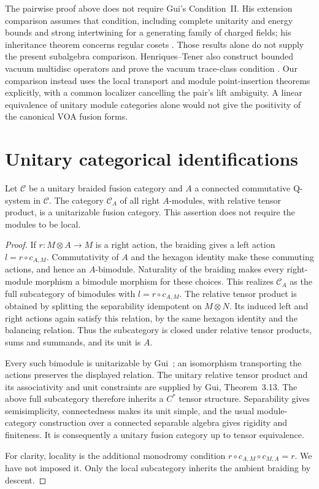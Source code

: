 The pairwise proof above does not require Gui's Condition~II.  His
extension comparison assumes that condition, including complete
unitarity and energy bounds and strong intertwining for a generating
family of charged fields; his inheritance theorem concerns regular
cosets \cite[Definition~4.15 and Theorems~4.20,~6.11]{GuiCompare}.
Those results alone do not supply the present subalgebra comparison.
Henriques--Tener also construct bounded vacuum
multidisc operators and prove the vacuum trace-class condition
\cite[Theorems~3.6 and~4.1]{HTGenusZero}.  Our comparison instead uses
the local transport and module point-insertion theorems explicitly,
with a common localizer cancelling the pair's lift ambiguity.  A linear
equivalence of unitary module categories alone would not give the
positivity of the canonical VOA fusion forms.

\section{Unitary categorical identifications}
\label{sec:analytic-category}

\begin{lemma}
\label{lem:analytic-unitary-all-modules}
Let $\mathcal C$ be a unitary braided fusion category and $A$ a
connected commutative Q-system in $\mathcal C$.  The category
$\mathcal C_A$ of all right $A$-modules, with relative tensor product,
is a unitarizable fusion category.  This assertion does not require
the modules to be local.
\end{lemma}
\begin{proof}
If $r:M\otimes A\to M$ is a right action, the braiding gives a left
action $l=r\circ c_{A,M}$.  Commutativity of $A$ and the hexagon
identity make these commuting actions, and hence an $A$-bimodule.
Naturality of the braiding makes every right-module morphism a
bimodule morphism for these choices.  This realizes $\mathcal C_A$
as the full subcategory of bimodules with $l=r\circ c_{A,M}$.
The relative tensor product is obtained by splitting the separability
idempotent on $M\otimes N$.  Its induced left and right actions again
satisfy this relation, by the same hexagon identity and the balancing
relation.  Thus the subcategory is closed under relative tensor
products, sums and summands, and its unit is $A$.

Every such bimodule is unitarizable by
Gui~\cite[Theorem~2.28]{Gui}; an isomorphism transporting the actions preserves
the displayed relation.  The unitary relative tensor product and its
associativity and unit constraints are supplied by Gui, Theorem~3.13.
The above full subcategory therefore inherits a $C^*$ tensor structure.
Separability gives semisimplicity, connectedness makes its unit simple,
and the usual module-category construction over a connected separable
algebra gives rigidity and finiteness.  It is consequently a unitary
fusion category up to tensor equivalence.

For clarity, locality is the additional monodromy condition
$r\circ c_{A,M}\circ c_{M,A}=r$.  We have not imposed it.  Only the
local subcategory inherits the ambient braiding by descent.
\end{proof}

